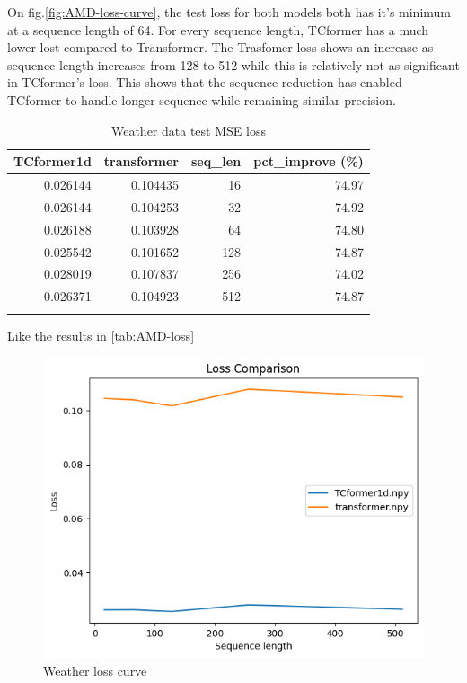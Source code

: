 \documentclass[stu,12pt,floatsintext]{apa7}
\begin{document}
On fig.\ref{fig:AMD-loss-curve}, the test loss for both models both has it's minimum at a sequence length of 64. For every sequence length, TCformer has a much lower lost compared to Transformer. The Trasfomer loss shows an increase as sequence length increases from 128 to 512 while this is relatively not as significant in TCformer's loss. This shows that the sequence reduction has enabled TCformer to handle longer sequence while remaining similar precision. 

\begin{table}[H]
\caption{Weather data test MSE loss}
\centering
\label{tab:weather-loss}
\begin{tabular}{rrrr}
\toprule
TCformer1d & transformer & seq\_len & pct\_improve (\%) \\
\midrule
0.026144 & 0.104435 & 16 & 74.97 \\
0.026144 & 0.104253 & 32 & 74.92 \\
0.026188 & 0.103928 & 64 & 74.80 \\
0.025542 & 0.101652 & 128 & 74.87 \\
0.028019 & 0.107837 & 256 & 74.02 \\
0.026371 & 0.104923 & 512 & 74.87 \\
\bottomrule\\
\end{tabular}
\label{tab:comparison}
\end{table}

Like the results in \ref{tab:AMD-loss} 


\begin{figure}[H]
    \centering
    \includegraphics[width=0.8\linewidth]{images/weather-loss-cmp.png}
    \caption{Weather loss curve}
    \label{fig:weather-loss-curve}
\end{figure}
\end{document}
